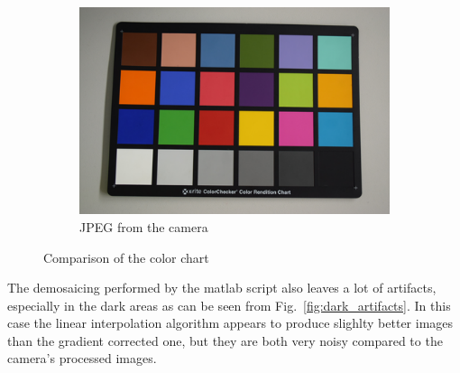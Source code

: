 \documentclass{article}
\begin{document}
\begin{figure}[htbp]
\begin{subfigure}{.33\textwidth}
  \centering
  \includegraphics[width=.95\linewidth]{camera_macbeth_color_small}
  \caption{JPEG from the camera}
\end{subfigure}
\caption{Comparison of the color chart}
\label{fig:chart}
\end{figure}
The demosaicing performed by the matlab script also leaves a lot of
artifacts, especially in the dark areas as can be seen from
Fig.~\ref{fig:dark_artifacts}. In this case the linear interpolation
algorithm appears to produce slighlty better images than the gradient
corrected one, but they are both very noisy compared to the camera's
processed images.
\end{document}
